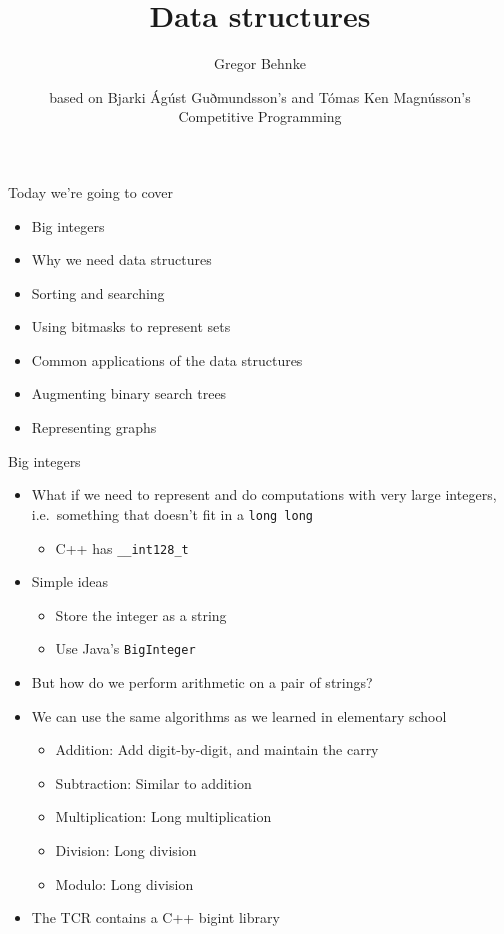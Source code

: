 \documentclass[12pt,t]{beamer}
\title{Data structures}
\author{Gregor Behnke}
\institute{Institute of Artificial Intelligence\\ Ulm University}
\date{\tiny based on Bjarki Ágúst Guðmundsson's and Tómas Ken Magnússon's\\Competitive Programming}
\newcommand{\bi}{\begin{itemize}}
\newcommand{\ei}{\end{itemize}}
\begin{document}
{
    \frame{
        \titlepage
    }
}


\begin{frame}{Today we're going to cover}
    \vspace{30pt}
    \bi
        \item Big integers
        \item Why we need data structures
        \item Sorting and searching
        \item Using bitmasks to represent sets
        \item Common applications of the data structures
        \item Augmenting binary search trees
        \item Representing graphs
    \ei
\end{frame}


\begin{frame}{Big integers}
    \bi
        \item What if we need to represent and do computations with very large integers, i.e.\ something that doesn't fit in a \texttt{long long}
        
        \bi
	  \item C++ has \texttt{\_\_int128\_t}
	\ei

        \vspace{5pt}
        \item Simple ideas
	  \bi
	    \item Store the integer as a string
	    \item Use Java's \texttt{BigInteger}
	  \ei
        \vspace{5pt}
        \item But how do we perform arithmetic on a pair of strings?
        \item We can use the same algorithms as we learned in elementary school
            \bi
                \item Addition: Add digit-by-digit, and maintain the carry
                \item Subtraction: Similar to addition
                \item Multiplication: Long multiplication
                \item Division: Long division
                \item Modulo: Long division
            \ei
        \item The TCR contains a C++ bigint library
    \ei
\end{frame}
\end{document}
